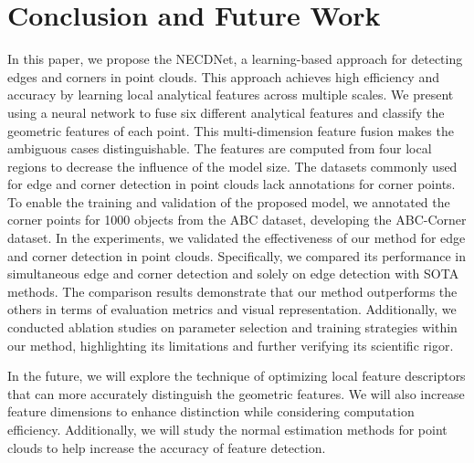 \documentclass[lettersize,journal]{IEEEtran}
\begin{document}
\section{Conclusion and Future Work}
\label{sec:conclusion and future work}
In this paper, we propose the NECDNet, a learning-based approach for detecting edges and corners in point clouds. This approach achieves high efficiency and accuracy by learning local analytical features across multiple scales. We present using a neural network to fuse six different analytical features and classify the geometric features of each point. This multi-dimension feature fusion makes the ambiguous cases distinguishable. The features are computed from four local regions to decrease the influence of the model size.
The datasets commonly used for edge and corner detection in point clouds lack annotations for corner points. To enable the training and validation of the proposed model, we annotated the corner points for 1000 objects from the ABC dataset, developing the ABC-Corner dataset.
In the experiments, we validated the effectiveness of our method for edge and corner detection in point clouds. Specifically, we compared its performance in simultaneous edge and corner detection and solely on edge detection with SOTA methods. The comparison results demonstrate that our method outperforms the others in terms of evaluation metrics and visual representation. Additionally, we conducted ablation studies on parameter selection and training strategies within our method, highlighting its limitations and further verifying its scientific rigor.

In the future, we will explore the technique of optimizing local feature descriptors that can more accurately distinguish the geometric features. We will also increase feature dimensions to enhance distinction while considering computation efficiency. Additionally, we will study the normal estimation methods for point clouds to help increase the accuracy of feature detection.



{}
\end{document}
